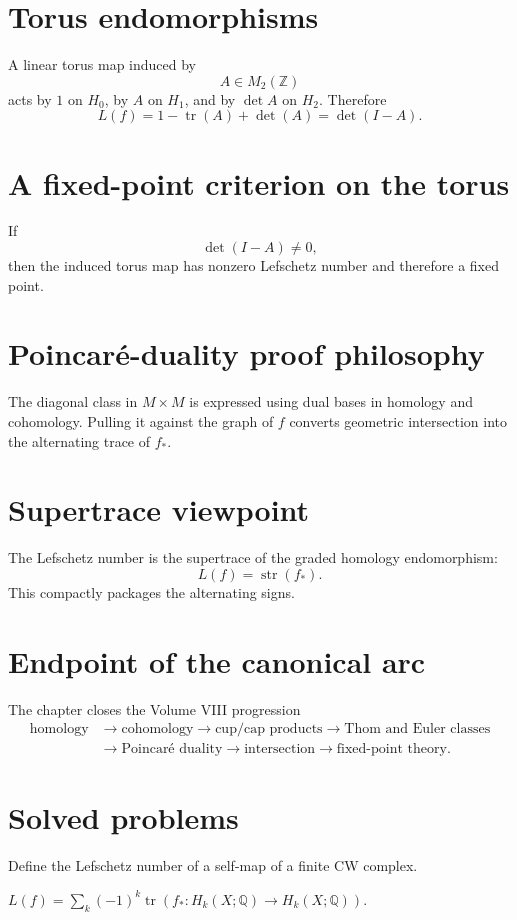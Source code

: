 \section{Torus endomorphisms}
A linear torus map induced by
\[
A\in M_2(\mathbb Z)
\]
acts by $1$ on $H_0$, by $A$ on $H_1$, and by $\det A$ on $H_2$.  Therefore
\[
L(f)=1-\operatorname{tr}(A)+\det(A)
=\det(I-A).
\]

\section{A fixed-point criterion on the torus}
If
\[
\det(I-A)\ne0,
\]
then the induced torus map has nonzero Lefschetz number and therefore a fixed
point.

\section{Poincaré-duality proof philosophy}
The diagonal class in $M\times M$ is expressed using dual bases in homology
and cohomology.  Pulling it against the graph of $f$ converts geometric
intersection into the alternating trace of $f_*$.

\section{Supertrace viewpoint}
The Lefschetz number is the supertrace of the graded homology endomorphism:
\[
L(f)=\operatorname{str}(f_*).
\]
This compactly packages the alternating signs.

\section{Endpoint of the canonical arc}
The chapter closes the Volume VIII progression
\[
\begin{aligned}
\text{homology}
&\to \text{cohomology}
\to \text{cup/cap products}
\to \text{Thom and Euler classes}\\
&\to \text{Poincaré duality}
\to \text{intersection}
\to \text{fixed-point theory}.
\end{aligned}
\]

\section{Solved problems}
\begin{problem}
Define the Lefschetz number of a self-map of a finite CW complex.
\end{problem}
\begin{solution}
$L(f)=\sum_k(-1)^k\operatorname{tr}(f_*:H_k(X;\mathbb Q)\to H_k(X;\mathbb Q))$.
\end{solution}

